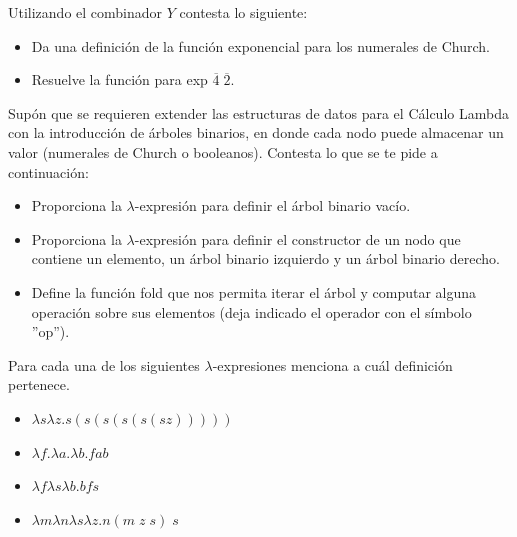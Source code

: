                 \begin{exercise}
                    Utilizando el combinador $Y$ contesta lo siguiente: \\
                    \begin{itemize}
                    	\item Da una definición de la función exponencial para los numerales de Church.
                    	\item Resuelve la función para \textsf{exp} $\overline{4} \; \overline{2}$.
		    \end{itemize}
                \end{exercise}


		\begin{exercise}
			Supón que se requieren extender las estructuras de datos para el Cálculo Lambda con la introducción de árboles binarios, en donde cada nodo puede almacenar un valor (numerales de Church o booleanos). Contesta lo que se te pide a continuación:\\
			\begin{itemize}
				\item Proporciona la $\lambda$-expresión para definir el árbol binario vacío.
				\item Proporciona la $\lambda$-expresión para definir el constructor de un nodo que contiene un elemento, un árbol binario izquierdo y un árbol binario derecho.
				\item Define la función \textsf{fold} que nos permita iterar el árbol y computar alguna operación sobre sus elementos (deja indicado el operador con el símbolo ''op'').
			\end{itemize}
		\end{exercise}



		\begin{exercise}
			Para cada una de los siguientes $\lambda$-expresiones menciona a cuál definición pertenece. \\
			\begin{itemize}
				\item $\lambda s\lambda z.s(s(s(s(s(sz)))))$
				\item $\lambda f.\lambda a.\lambda b.fab $
				\item $\lambda f\lambda s\lambda b. bfs$
				\item $\lambda m\lambda n\lambda s\lambda z.n(m \; z \; s) \; s$
			\end{itemize}
		\end{exercise}

                    
            